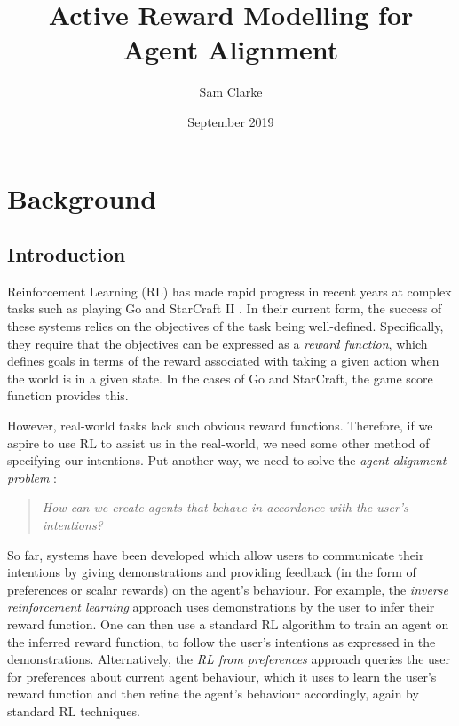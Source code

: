\documentclass[11pt, a4paper, bibliography=totoc]{report}
\begin{document}
\title{Active Reward Modelling for Agent Alignment}
\author{Sam Clarke}
\date{September 2019}
\renewcommand{\bibname}{References}
\maketitle

\begin{abstract} %

\end{abstract}

\tableofcontents

\part{Background}

\chapter{Introduction}
Reinforcement Learning (RL) has made rapid progress in recent years at complex tasks such as playing Go \cite{silver2016mastering} and StarCraft II \cite{alphastarblog}. In their current form, the success of these systems relies on the objectives of the task being well-defined. Specifically, they require that the objectives can be expressed as a \textit{reward function}, which defines goals in terms of the reward associated with taking a given action when the world is in a given state. In the cases of Go and StarCraft, the game score function provides this.

However, real-world tasks lack such obvious reward functions. Therefore, if we aspire to use RL to assist us in the real-world, we need some other method of specifying our intentions. Put another way, we need to solve the \textit{agent alignment problem} \cite[p.~1]{Leike2018}:
\begin{quote}
	\textit{How can we create agents that behave in accordance with the user's intentions?}
\end{quote}

So far, systems have been developed which allow users to communicate their intentions by giving demonstrations and providing feedback (in the form of preferences or scalar rewards) on the agent's behaviour. For example, the \textit{inverse reinforcement learning} approach \cite{Ng2000, Ziebart2008} uses demonstrations by the user to infer their reward function. One can then use a standard RL algorithm to train an agent on the inferred reward function, to follow the user's intentions as expressed in the demonstrations. Alternatively, the \textit{RL from preferences} approach \cite{Christiano2017} queries the user for preferences about current agent behaviour, which it uses to learn the user's reward function and then refine the agent's behaviour accordingly, again by standard RL techniques.
\end{document}
